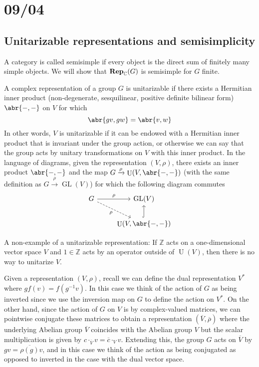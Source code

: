 \documentclass[11pt,leqno]{article}
\theoremstyle{plain}
\theoremstyle{definition}
\numberwithin{equation}{section}
\numberwithin{lem}{section}
\DeclareMathOperator{\GL}{GL}
\DeclareMathOperator{\U}{U}
\newcommand{\catname}[1]{{\normalfont\mathbf{#1}}}
\newcommand{\Rep}{\catname{Rep}}
\begin{document}
\newpage\section{09/04}
\subsection{Unitarizable representations and semisimplicity}
A category is called semisimple if every object is the direct sum of finitely many simple objects. We will show that $\Rep_{\mathbb C}(G)$ is semisimple for $G$ finite.

A complex representation of a group $G$ is unitarizable if there exists a Hermitian inner product (non-degenerate, sesquilinear, positive definite bilinear form) $\abr{-,-}$ on $V$ for which 
\[\abr{gv,gw} = \abr{v,w}\]
In other words, $V$ is unitarizable if it can be endowed with a Hermitian inner product that is invariant under the group action, or otherwise we can say that the group acts by unitary transformations on $V$ with this inner product. In the language of diagrams, given the representation $(V,\rho)$, there exists an inner product $\abr{-,-}$ and the map $G\xrightarrow{\rho} \U(V,\abr{-,-})$ (with the same definition as $G\xrightarrow{\rho} \GL(V)$) for which the following diagram commutes
\[\begin{tikzcd}
	G & {\GL(V)} \\
	& {\U(V,\abr{-,-})}
	\arrow["\rho", from=1-1, to=1-2]
	\arrow["\rho"', dashed, from=1-1, to=2-2]
	\arrow[hook, from=2-2, to=1-2]
\end{tikzcd}\]

A non-example of a unitarizable representation: If $\mathbb Z$ acts on a one-dimensional vector space $V$ and $1\in \mathbb Z$ acts by an operator outside of $\U(V)$, then there is no way to unitarize $V$.

Given a representation $(V,\rho)$, recall we can define the dual representation $V^\ast$ where $gf(v) = f(g^{-1}v)$. In this case we think of the action of $G$ as being inverted since we use the inversion map on $G$ to define the action on $V^\ast$. On the other hand, since the action of $G$ on $V$ is by complex-valued matrices, we can pointwise conjugate these matrices to obtain a representation $(\overline V,\overline \rho)$ where the underlying Abelian group $\overline V$ coincides with the Abelian group $V$ but the scalar multiplication is given by $c\cdot_{\overline V} v = \overline{c}\cdot_Vv$. Extending this, the group $G$ acts on $\overline V$ by $gv = \overline{\rho(g)}v$, and in this case we think of the action as being conjugated as opposed to inverted in the case with the dual vector space.
\end{document}

